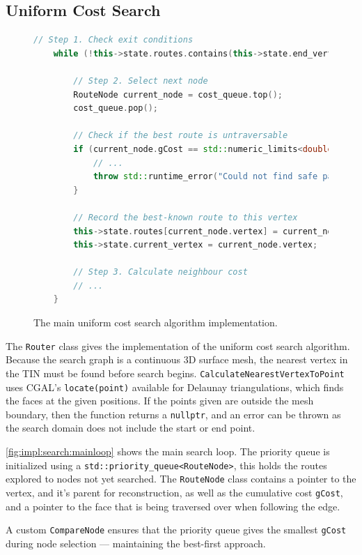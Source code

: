 \documentclass[12pt]{article}
\begin{document}
\subsection{Uniform Cost Search}

\begin{figure}[H]
  \centering
  \begin{lstlisting}[language=c++]
	// Step 1. Check exit conditions
	while (!this->state.routes.contains(this->state.end_vertex)) {

		// Step 2. Select next node
		RouteNode current_node = cost_queue.top();
		cost_queue.pop();
		
		// Check if the best route is untraversable
		if (current_node.gCost == std::numeric_limits<double>::infinity()) {
			// ...
			throw std::runtime_error("Could not find safe path");
		}

		// Record the best-known route to this vertex
		this->state.routes[current_node.vertex] = current_node;
		this->state.current_vertex = current_node.vertex;

		// Step 3. Calculate neighbour cost
		// ...
	}
	\end{lstlisting}
  \caption{The main uniform cost search algorithm implementation.}
  \label{fig:impl:search:mainloop}
\end{figure}

The \texttt{Router} class gives the implementation of the uniform cost search algorithm. Because the search graph is a continuous 3D surface mesh, the nearest vertex in the TIN must be found before search begins. \texttt{CalculateNearestVertexToPoint} uses CGAL's \texttt{locate(point)} available for Delaunay triangulations, which finds the faces at the given positions. If the points given are outside the mesh boundary, then the function returns a \texttt{nullptr}, and an error can be thrown as the search domain does not include the start or end point.

\autoref{fig:impl:search:mainloop} shows the main search loop. The priority queue is initialized using a \texttt{std::priority\_queue<RouteNode>}, this holds the routes explored to nodes not yet searched. The \texttt{RouteNode} class contains a pointer to the vertex, and it's parent for reconstruction, as well as the cumulative cost \texttt{gCost}, and a pointer to the face that is being traversed over when following the edge.

A custom \texttt{CompareNode} ensures that the priority queue gives the smallest \texttt{gCost} during node selection --- maintaining the best-first approach.
\end{document}
